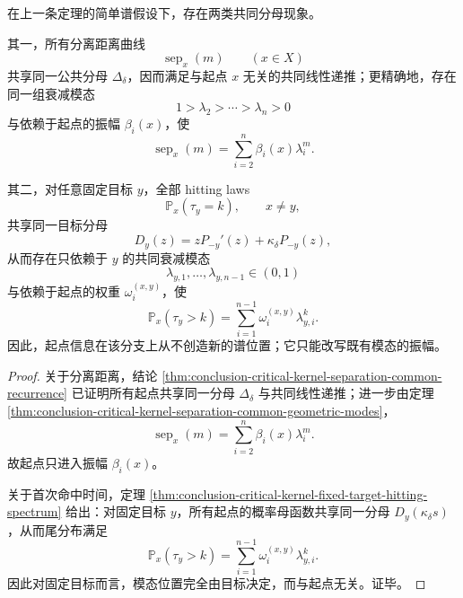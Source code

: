 \begin{theorem}\label{thm:conclusion-endpoint-startpoint-only-amplitude-not-modes}
在上一条定理的简单谱假设下，存在两类共同分母现象。

其一，所有分离距离曲线
\[
\operatorname{sep}_x(m)\qquad (x\in X)
\]
共享同一公共分母 \(\Delta_\delta\)，因而满足与起点 \(x\) 无关的共同线性递推；更精确地，存在同一组衰减模态
\[
1>\lambda_2>\cdots>\lambda_n>0
\]
与依赖于起点的振幅 \(\beta_i(x)\)，使
\[
\operatorname{sep}_x(m)=\sum_{i=2}^{n}\beta_i(x)\lambda_i^m.
\]

其二，对任意固定目标 \(y\)，全部 hitting laws
\[
\mathbb P_x(\tau_y=k),\qquad x\ne y,
\]
共享同一目标分母
\[
D_y(z)=zP_{-y}'(z)+\kappa_\delta P_{-y}(z),
\]
从而存在只依赖于 \(y\) 的共同衰减模态
\[
\lambda_{y,1},\dots,\lambda_{y,n-1}\in(0,1)
\]
与依赖于起点的权重 \(\omega_i^{(x,y)}\)，使
\[
\mathbb P_x(\tau_y>k)=\sum_{i=1}^{n-1}\omega_i^{(x,y)}\lambda_{y,i}^{k}.
\]
因此，起点信息在该分支上从不创造新的谱位置；它只能改写既有模态的振幅。
\end{theorem}
\begin{proof}
关于分离距离，结论 \ref{thm:conclusion-critical-kernel-separation-common-recurrence} 已证明所有起点共享同一分母 \(\Delta_\delta\) 与共同线性递推；进一步由定理 \ref{thm:conclusion-critical-kernel-separation-common-geometric-modes}，
\[
\operatorname{sep}_x(m)=\sum_{i=2}^{n}\beta_i(x)\lambda_i^m.
\]
故起点只进入振幅 \(\beta_i(x)\)。

关于首次命中时间，定理 \ref{thm:conclusion-critical-kernel-fixed-target-hitting-spectrum} 给出：对固定目标 \(y\)，所有起点的概率母函数共享同一分母 \(D_y(\kappa_\delta s)\)，从而尾分布满足
\[
\mathbb P_x(\tau_y>k)=\sum_{i=1}^{n-1}\omega_i^{(x,y)}\lambda_{y,i}^{k}.
\]
因此对固定目标而言，模态位置完全由目标决定，而与起点无关。证毕。
\end{proof}

